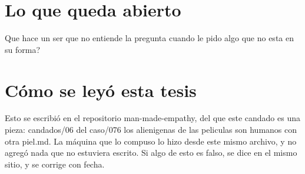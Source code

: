 \documentclass[11pt,a4paper]{article}
\begin{document}
\section{Lo que queda abierto}
\textquestiondown{}Que hace un ser que no entiende la pregunta cuando le pido algo que no esta en su forma?

\section*{Cómo se leyó esta tesis}
Esto se escribió en el repositorio man-made-empathy, del que este candado es una pieza: candados/06 del caso/076 los alienigenas de las peliculas son humanos con otra piel.md. La máquina que lo compuso lo hizo desde este mismo archivo, y no agregó nada que no estuviera escrito. Si algo de esto es falso, se dice en el mismo sitio, y se corrige con fecha.
\end{document}
